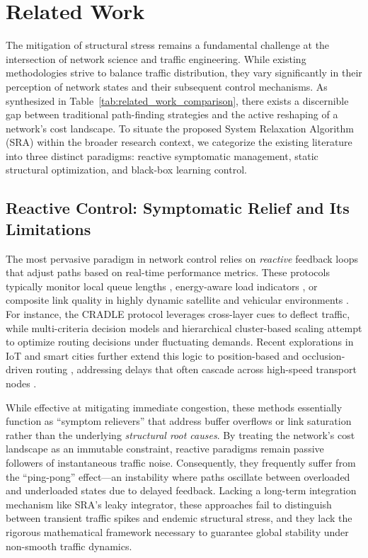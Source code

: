 \documentclass[journal]{IEEEtran}
\theoremstyle{plain}
\theoremstyle{definition}
\begin{document}
\section{Related Work}
\label{sec:related_work}

The mitigation of structural stress remains a fundamental challenge at the intersection of network science and traffic engineering. While existing methodologies strive to balance traffic distribution, they vary significantly in their perception of network states and their subsequent control mechanisms. As synthesized in Table~\ref{tab:related_work_comparison}, there exists a discernible gap between traditional path-finding strategies and the active reshaping of a network's cost landscape. To situate the proposed System Relaxation Algorithm (SRA) within the broader research context, we categorize the existing literature into three distinct paradigms: reactive symptomatic management, static structural optimization, and black-box learning control.

\subsection{Reactive Control: Symptomatic Relief and Its Limitations}

The most pervasive paradigm in network control relies on \textit{reactive} feedback loops that adjust paths based on real-time performance metrics. These protocols typically monitor local queue lengths \cite{Macabale2020Cradle}, energy-aware load indicators \cite{SM2025Novel}, or composite link quality in highly dynamic satellite and vehicular environments \cite{Wang2025VANET, Fu2024SatelliteBC,wang2022cdmr}. For instance, the CRADLE protocol \cite{Macabale2020Cradle} leverages cross-layer cues to deflect traffic, while multi-criteria decision models \cite{Fouad2014MultiCriteria} and hierarchical cluster-based scaling \cite{Guizani2011Hierarchical} attempt to optimize routing decisions under fluctuating demands. Recent explorations in IoT and smart cities further extend this logic to position-based and occlusion-driven routing \cite{Darabkh2025SmartCity, Aditya2020ClosenessCluster}, addressing delays that often cascade across high-speed transport nodes \cite{Wu2024RailwayNode,ma2022traffic}.

While effective at mitigating immediate congestion, these methods essentially function as ``symptom relievers'' that address buffer overflows or link saturation rather than the underlying \textit{structural root causes}. By treating the network's cost landscape as an immutable constraint, reactive paradigms remain passive followers of instantaneous traffic noise. Consequently, they frequently suffer from the ``ping-pong'' effect---an instability where paths oscillate between overloaded and underloaded states due to delayed feedback. Lacking a long-term integration mechanism like SRA's leaky integrator, these approaches fail to distinguish between transient traffic spikes and endemic structural stress, and they lack the rigorous mathematical framework necessary to guarantee global stability under non-smooth traffic dynamics.
\end{document}
